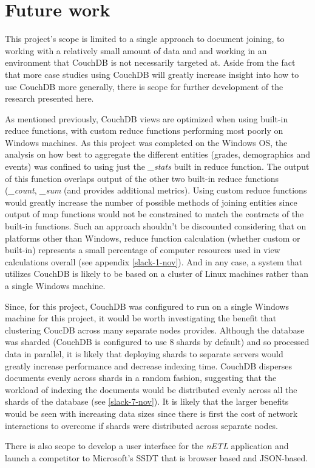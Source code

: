 \section{Future work}
This project's scope is limited to a single approach to document joining, to working with a relatively small amount of data and and working in an environment that CouchDB is not necessarily targeted at. Aside from the fact that more case studies using CouchDB will greatly increase insight into how to use CouchDB more generally, there is scope for further development of the research presented here.

As mentioned previously, CouchDB views are optimized when using built-in reduce functions, with custom reduce functions performing most poorly on Windows machines. As this project was completed on the Windows OS, the analysis on how best to aggregate the different entities (grades, demographics and events) was confined to using just the \textit{\_stats} built in reduce function. The output of this function overlaps output of the other two built-in reduce functions (\textit{\_count}, \textit{\_sum} (and provides additional metrics). Using custom reduce functions would greatly increase the number of possible methods of joining entities since output of map functions would not be constrained to match the contracts of the built-in functions. Such an approach shouldn't be discounted considering that on platforms other than Windows, reduce function calculation (whether custom or built-in) represents a small percentage of computer resources used in view calculations overall (see appendix \ref{slack-1-nov}). And in any case, a system that utilizes CouchDB is likely to be based on a cluster of Linux machines rather than a single Windows machine.

Since, for this project, CouchDB was configured to run on a single Windows machine for this project, it would be worth investigating the benefit that clustering CoucDB across many separate nodes provides. Although the database was sharded (CouchDB is configured to use 8 shards by default) and so processed data in parallel, it is likely that deploying shards to separate servers would greatly increase performance and decrease indexing time. CouchDB disperses documents evenly across shards in a random fashion, suggesting that the workload of indexing the documents would be distributed evenly across all the shards of the database (see \ref{slack-7-nov}). It is likely that the larger benefits would be seen with increasing data sizes since there is first the cost of network interactions to overcome if shards were distributed across separate nodes.

There is also scope to develop a user interface for the \textit{nETL} application and launch a competitor to Microsoft's SSDT that is browser based and JSON-based.